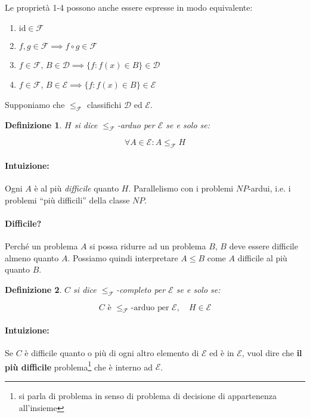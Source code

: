 \documentclass[a4paper,10pt,oneside]{article}
\theoremstyle{break}
\newtheorem{deff}{Definizione}[section]
\begin{document}
\dotfill

Le proprietà 1-4 possono anche essere espresse in modo equivalente:
\begin{enumerate}
 \item $\text{id} \in \mathcal{F}$
 \item $f, g \in \mathcal F \implies f \circ g \in \mathcal F$
 \item $f \in \mathcal F$, $B \in \mathcal D \implies \{f : f(x) \in B\} \in \mathcal D$
 \item $f \in \mathcal F$, $B \in \mathcal E \implies \{f : f(x) \in B\} \in \mathcal E$
\end{enumerate}
\newpage

Supponiamo che $\leq_\mathcal{F}$ classifichi $\mathcal{D}$ ed $\mathcal{E}$.

\dotfill

\begin{deff}
 $H$ si dice $\leq_\mathcal{F}$-arduo per $\mathcal{E}$ se e solo se:
 
 \[ \forall A \in \mathcal{E} : A \leq_\mathcal{F} H \]
\end{deff}

\paragraph{Intuizione:} Ogni $A$ è al più \emph{difficile} quanto $H$. Parallelismo con i problemi $NP$-ardui, i.e. i problemi ``più difficili'' della classe $NP$.

\paragraph{Difficile?} Perché un problema $A$ si possa ridurre ad un problema $B$, $B$ deve essere difficile almeno quanto $A$. Possiamo quindi interpretare $A \leq B$ come $A$ difficile al più quanto $B$.

\dotfill

\begin{deff}
 $C$ si dice $\leq_\mathcal{F}$-completo per $\mathcal{E}$ se e solo se:
 
 \[ C \text{ è }\leq_\mathcal{F}\text{-arduo per } \mathcal{E}, \quad H \in \mathcal{E} \]
\end{deff}

\paragraph{Intuizione:} Se $C$ è difficile quanto o più di ogni altro elemento di $\mathcal{E}$ ed è in $\mathcal E$, vuol dire che \textbf{il più difficile} problema\footnote{si parla di problema in senso di problema di decisione di appartenenza all'insieme} che è interno ad $\mathcal E$.\smallskip
\end{document}
